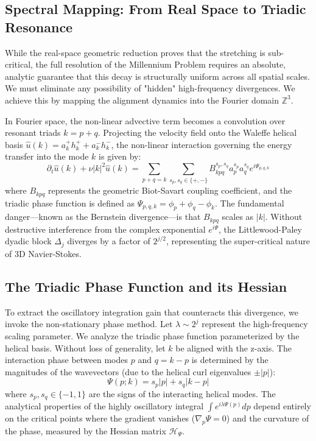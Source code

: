 \documentclass[12pt,a4paper]{article}
\theoremstyle{plain}
\theoremstyle{definition}
\theoremstyle{remark}
\begin{document}
\subsection{Spectral Mapping: From Real Space to Triadic Resonance}
While the real-space geometric reduction proves that the stretching is sub-critical, the full resolution of the Millennium Problem requires an absolute, analytic guarantee that this decay is structurally uniform across all spatial scales. We must eliminate any possibility of "hidden" high-frequency divergences. We achieve this by mapping the alignment dynamics into the Fourier domain $\mathbb{Z}^3$.

In Fourier space, the non-linear advective term becomes a convolution over resonant triads $k = p + q$. Projecting the velocity field onto the Waleffe helical basis $\hat{u}(k) = a_k^+ h_k^+ + a_k^- h_k^-$, the non-linear interaction governing the energy transfer into the mode $k$ is given by:
\begin{equation}
    \partial_t \hat{u}(k) + \nu |k|^2 \hat{u}(k) = \sum_{p+q=k} \sum_{s_p, s_q \in \{+, -\}} B_{kpq}^{s_p, s_q} a_p^{s_p} a_q^{s_q} e^{i \Psi_{p,q,k}}
\end{equation}
where $B_{kpq}$ represents the geometric Biot-Savart coupling coefficient, and the triadic phase function is defined as $\Psi_{p,q,k} = \phi_p + \phi_q - \phi_k$. 
The fundamental danger—known as the Bernstein divergence—is that $B_{kpq}$ scales as $|k|$. Without destructive interference from the complex exponential $e^{i \Psi}$, the Littlewood-Paley dyadic block $\Delta_j$ diverges by a factor of $2^{j/2}$, representing the super-critical nature of 3D Navier-Stokes.

\subsection{The Triadic Phase Function and its Hessian}
To extract the oscillatory integration gain that counteracts this divergence, we invoke the non-stationary phase method. Let $\lambda \sim 2^j$ represent the high-frequency scaling parameter. We analyze the triadic phase function parameterized by the helical basis. Without loss of generality, let $k$ be aligned with the z-axis. The interaction phase between modes $p$ and $q = k-p$ is determined by the magnitudes of the wavevectors (due to the helical curl eigenvalues $\pm |p|$):
\begin{equation}
    \Psi(p; k) = s_p |p| + s_q |k - p|
\end{equation}
where $s_p, s_q \in \{-1, 1\}$ are the signs of the interacting helical modes. The analytical properties of the highly oscillatory integral $\int e^{i \lambda \Psi(p)} dp$ depend entirely on the critical points where the gradient vanishes ($\nabla_p \Psi = 0$) and the curvature of the phase, measured by the Hessian matrix $\mathcal{H}_\Psi$.
\end{document}
